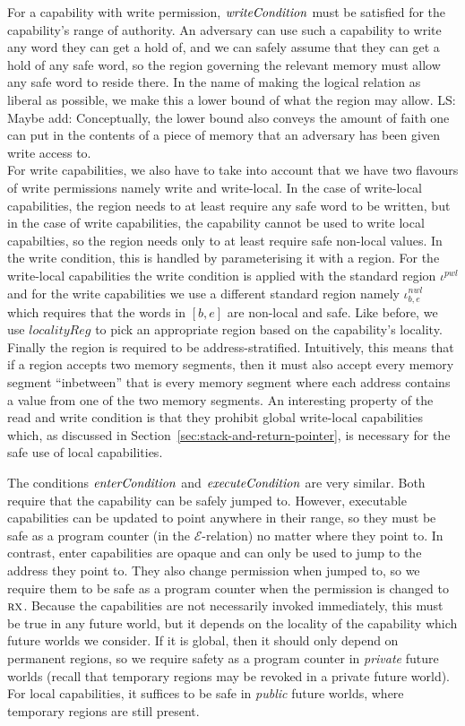 \documentclass[acmsmall,review]{acmart}\settopmatter{printfolios=true}
\newcommand\lau[1]{{\color{purple} \sf \footnotesize {LS: #1}}\\}
\newcommand{\var}[1]{\mathit{#1}}
\newcommand{\start}{\var{b}}
\newcommand{\addrend}{\var{e}}
\newcommand{\nwl}{\var{nwl}}
\newcommand{\pwl}{\var{pwl}}
\newcommand{\plainfun}[2]{
  \ifthenelse{\equal{#2}{}}
  {\mathit{#1}}
  {\mathit{#1}(#2)}
}
\newcommand{\writeCond}[1]{\plainfun{writeCondition}{#1}}
\newcommand{\execCond}[1]{\plainfun{executeCondition}{#1}}
\newcommand{\entryCond}[1]{\plainfun{enterCondition}{#1}}
\newcommand{\asmType}{\plaindom{AsmType}}
\newcommand{\plaindom}[1]{\mathrm{#1}}
\newcommand{\intr}[2]{\mathcal{#1}}
\newcommand{\exprintr}[1]{\intr{E}{#1}}
\newcommand{\stder}{\exprintr{\asmType}}
\newcommand{\plainperm}[1]{\textsc{#1}}
\newcommand{\exec}{\plainperm{rx}}
\begin{document}
For a capability with write permission, $\writeCond{}$ must be satisfied for the
capability's range of authority. An adversary can use such a capability to write
any word they can get a hold of, and we can safely assume that they can get a
hold of any safe word, so the region governing the relevant memory must allow
any safe word to reside there. In the name of making the logical relation as
liberal as possible, we make this a lower bound of what the region may allow.
\lau{Maybe add: Conceptually, the lower bound also conveys the amount of faith
  one can put in the contents of a piece of memory that an adversary has been
  given write access to.}  For write capabilities, we also have to take into
account that we have two flavours of write permissions namely write and
write-local. In the case of write-local capabilities, the region needs to at
least require any safe word to be written, but in the case of write
capabilities, the capability cannot be used to write local capabilties, so the
region needs only to at least require safe non-local values.  In the write
condition, this is handled by parameterising it with a region. For the
write-local capabilities the write condition is applied with the standard region
$\iota^\pwl$ and for the write capabilities we use a different standard region
namely $\iota^\nwl_{\start,\addrend}$ which requires that the words in
$[\start,\addrend]$ are non-local and safe. Like before, we use
$\var{localityReg}$ to pick an appropriate region based on the capability's
locality. Finally the region is required to be address-stratified. Intuitively,
this means that if a region accepts two memory segments, then it must also
accept every memory segment ``inbetween'' that is every memory segment where
each address contains a value from one of the two memory segments. An
interesting property of the read and write condition is that they prohibit
global write-local capabilities which, as discussed in
Section~\ref{sec:stack-and-return-pointer}, is necessary for the safe use of
local capabilities.

The conditions $\entryCond{}$ and $\execCond{}$ are very similar. Both require
that the capability can be safely jumped to. However, executable capabilities
can be updated to point anywhere in their range, so they must be safe as a
program counter (in the $\stder$-relation) no matter where they point to. In
contrast, enter capabilities are opaque and can only be used to jump to the
address they point to. They also change permission when jumped to, so we require
them to be safe as a program counter when the permission is changed to $\exec$.
Because the capabilities are not necessarily invoked immediately, this must be
true in any future world, but it depends on the locality of the capability which
future worlds we consider. If it is global, then it should only depend on
permanent regions, so we require safety as a program counter in \emph{private}
future worlds (recall that temporary regions may be revoked in a private future
world). For local capabilities, it suffices to be safe in \emph{public} future
worlds, where temporary regions are still present.
\end{document}
